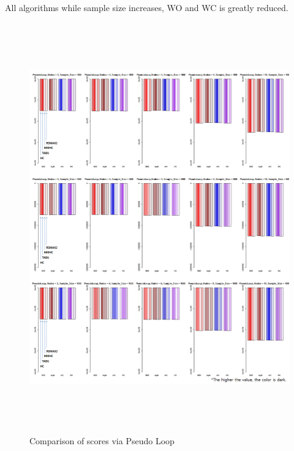 All algorithms while sample size increases, WO and WC is greatly reduced.
	
	\begin{figure}[p]
	\centering
		\includegraphics[height=500pt]{images/04_PseudoLoop_Score}
		\caption{Comparison of scores via Pseudo Loop}
	\end{figure}	

